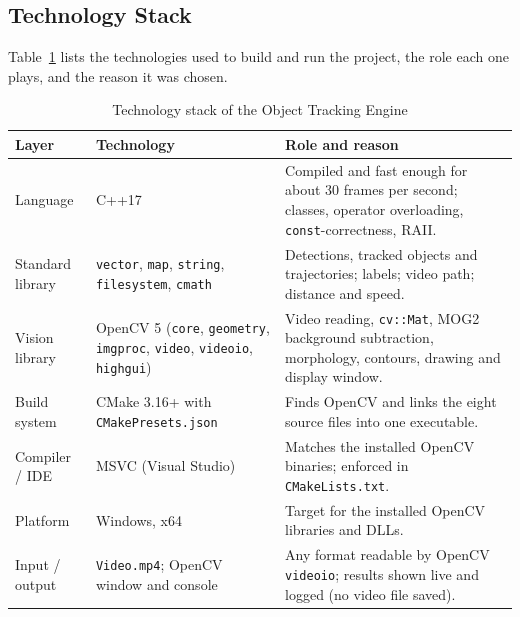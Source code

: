 \documentclass[12pt,a4paper,oneside]{book}
\begin{document}
\subsection{Technology Stack}
Table~\ref{tab:stack} lists the technologies used to build and run the project, the role each one plays, and the reason it was chosen.

\begin{table}[H]
\centering

\footnotesize
\begin{tabular}{@{}p{2.7cm}p{4.2cm}p{8.1cm}@{}}
\toprule
\textbf{Layer} & \textbf{Technology} & \textbf{Role and reason}\\
\midrule
Language & C++17 & Compiled and fast enough for about 30 frames per second; classes, operator overloading, \texttt{const}-correctness, RAII.\\
Standard library & \texttt{vector}, \texttt{map}, \texttt{string}, \texttt{filesystem}, \texttt{cmath} & Detections, tracked objects and trajectories; labels; video path; distance and speed.\\
Vision library & OpenCV 5 (\texttt{core}, \texttt{geometry}, \texttt{imgproc}, \texttt{video}, \texttt{videoio}, \texttt{highgui}) & Video reading, \texttt{cv::Mat}, MOG2 background subtraction, morphology, contours, drawing and display window.\\
Build system & CMake 3.16+ with \texttt{CMakePresets.json} & Finds OpenCV and links the eight source files into one executable.\\
Compiler / IDE & MSVC (Visual Studio) & Matches the installed OpenCV binaries; enforced in \texttt{CMakeLists.txt}.\\
Platform & Windows, x64 & Target for the installed OpenCV libraries and DLLs.\\
Input / output & \texttt{Video.mp4}; OpenCV window and console & Any format readable by OpenCV \texttt{videoio}; results shown live and logged (no video file saved).\\
\bottomrule
\end{tabular}
\caption{Technology stack of the Object Tracking Engine}
\label{tab:stack}
\end{table}

\end{document}
